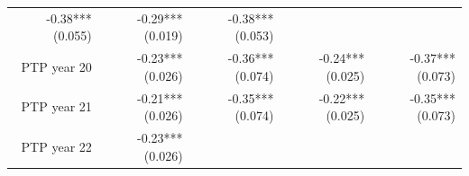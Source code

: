 \documentclass[]{article}
\begin{document}
\begin{longtable}[c]{@{}rrrrr@{}}
\begin{minipage}[t]{0.16\columnwidth}
-0.38*** (0.055)
\strut\end{minipage} &
\begin{minipage}[t]{0.21\columnwidth}\raggedleft\strut
-0.29*** (0.019)
\strut\end{minipage} &
\begin{minipage}[t]{0.15\columnwidth}\raggedleft\strut
-0.38*** (0.053)
\strut\end{minipage}\tabularnewline
\begin{minipage}[t]{0.17\columnwidth}\raggedleft\strut
PTP year 20
\strut\end{minipage} &
\begin{minipage}[t]{0.18\columnwidth}\raggedleft\strut
-0.23*** (0.026)
\strut\end{minipage} &
\begin{minipage}[t]{0.16\columnwidth}\raggedleft\strut
-0.36*** (0.074)
\strut\end{minipage} &
\begin{minipage}[t]{0.21\columnwidth}\raggedleft\strut
-0.24*** (0.025)
\strut\end{minipage} &
\begin{minipage}[t]{0.15\columnwidth}\raggedleft\strut
-0.37*** (0.073)
\strut\end{minipage}\tabularnewline
\begin{minipage}[t]{0.17\columnwidth}\raggedleft\strut
PTP year 21
\strut\end{minipage} &
\begin{minipage}[t]{0.18\columnwidth}\raggedleft\strut
-0.21*** (0.026)
\strut\end{minipage} &
\begin{minipage}[t]{0.16\columnwidth}\raggedleft\strut
-0.35*** (0.074)
\strut\end{minipage} &
\begin{minipage}[t]{0.21\columnwidth}\raggedleft\strut
-0.22*** (0.025)
\strut\end{minipage} &
\begin{minipage}[t]{0.15\columnwidth}\raggedleft\strut
-0.35*** (0.073)
\strut\end{minipage}\tabularnewline
\begin{minipage}[t]{0.17\columnwidth}\raggedleft\strut
PTP year 22
\strut\end{minipage} &
\begin{minipage}[t]{0.18\columnwidth}\raggedleft\strut
-0.23*** (0.026)
\strut\end{minipage} &
\begin{minipage}[t]{0.16\columnwidth}\raggedleft\strut

\end{minipage}
\end{longtable}
\end{document}
